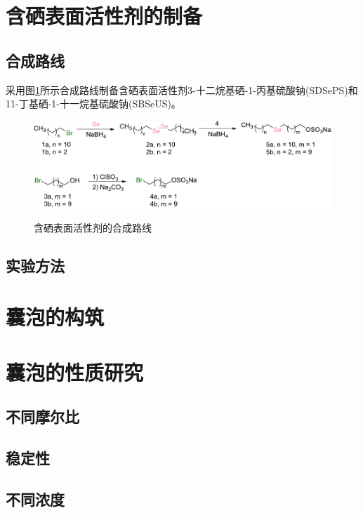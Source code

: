 \documentclass[bachelor,fandolfonts,replaceperiod]{jnuthesis}
\begin{document}
    \zhlipsum[1]
    
    \section{含硒表面活性剂的制备}
    \subsection{合成路线}
    采用图\ref{fig:synthesis-scheme}所示合成路线制备含硒表面活性剂3-十二烷基硒-1-丙基硫酸钠(SDSePS)和
    11-丁基硒-1-十一烷基硫酸钠(SBSeUS)。
    \begin{figure}[htbp]
        \centering
        \includegraphics[scale=0.89]{figure/synthesis-scheme.pdf}\\
        \caption{含硒表面活性剂的合成路线}\label{fig:synthesis-scheme}
    \end{figure}
    \subsection{实验方法}
    \zhlipsum[1]
    
    \section{囊泡的构筑}
    \zhlipsum[1]
    
    \section{囊泡的性质研究}
    \subsection{不同摩尔比}
    
    \subsection{稳定性}
    
    \subsection{不同浓度}
    
\end{document}
